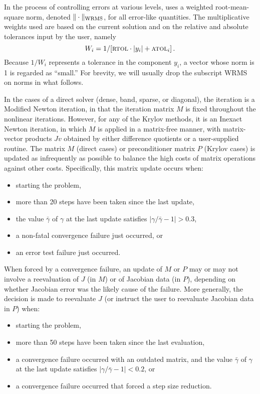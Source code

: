 In the process of controlling errors at various levels, {\cvode} uses a
weighted root-mean-square norm, denoted $\|\cdot\|_{\mbox{\scriptsize WRMS}}$,
for all error-like quantities.  The multiplicative weights used are
based on the current solution and on the relative and absolute
tolerances input by the user, namely
\begin{equation}\label{e:errwt}
 W_i = 1 / [\mbox{\sc rtol} \cdot |y_i| + \mbox{\sc atol}_i ] \, .
\end{equation}
Because $1/W_i$ represents a tolerance in the component $y_i$, a vector
whose norm is 1 is regarded as ``small.''  For brevity, we will
usually drop the subscript WRMS on norms in what follows.

In the cases of a direct solver (dense, band, sparse, or diagonal), the
iteration is a Modified Newton iteration, in that the iteration matrix
$M$ is fixed throughout the nonlinear iterations.  However, for any of
the Krylov methods, it is an Inexact Newton iteration, in which $M$ is
applied in a matrix-free manner, with matrix-vector products $Jv$
obtained by either difference quotients or a user-supplied routine.
The matrix $M$ (direct cases) or preconditioner matrix $P$ (Krylov
cases) is updated as infrequently as possible to balance the high costs
of matrix operations against other costs.  Specifically, this matrix
update occurs when:
\begin{itemize}
\item starting the problem,
\item more than 20 steps have been taken since the last update,
\item the value $\bar{\gamma}$ of $\gamma$ at the last update
satisfies $|\gamma/\bar{\gamma} - 1| > 0.3$,
\item a non-fatal convergence failure just occurred, or
\item an error test failure just occurred.
\end{itemize}
When forced by a convergence failure, an update of $M$ or $P$ may or
may not involve a reevaluation of $J$ (in $M$) or of Jacobian data
(in $P$), depending on whether Jacobian error was the likely cause of
the failure.  More generally, the decision is made to reevaluate $J$
(or instruct the user to reevaluate Jacobian data in $P$) when:
\begin{itemize}
\item starting the problem,
\item more than 50 steps have been taken since the last evaluation,
\item a convergence failure occurred with an outdated matrix, and
the value $\bar{\gamma}$ of $\gamma$ at the last update
satisfies $|\gamma/\bar{\gamma} - 1| < 0.2$, or
\item a convergence failure occurred that forced a step size reduction.
\end{itemize}

